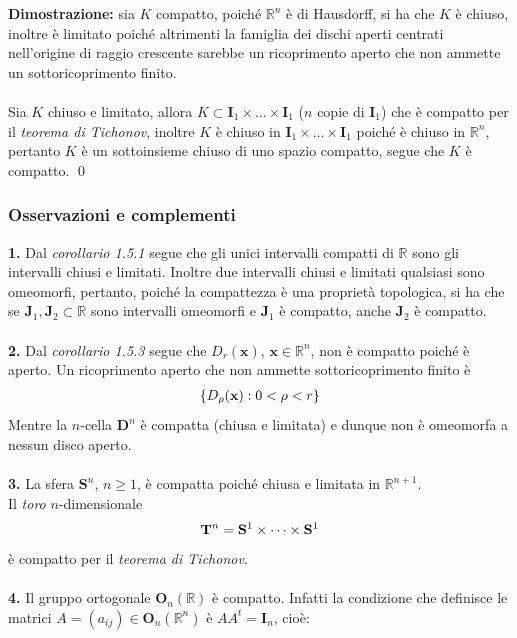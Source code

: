 \documentclass{article}
\begin{document}
\textbf{Dimostrazione:} sia $K$ compatto, poiché $\mathbb{R}^n$ è di Hausdorff, si ha che $K$ è chiuso, inoltre è limitato poiché altrimenti la famiglia dei dischi aperti centrati nell'origine di raggio crescente sarebbe un ricoprimento aperto che non ammette un sottoricoprimento finito. \\ \\
Sia $K$ chiuso e limitato, allora $K \subset \mathbf{I}_1 \times \dots \times \mathbf{I}_1$ ($n$ copie di $\mathbf{I}_1$) che è compatto per il \textit{teorema di Tichonov}, inoltre $K$ è chiuso in $\mathbf{I}_1 \times \dots \times \mathbf{I}_1$ poiché è chiuso in $\mathbb{R}^n$, pertanto $K$ è un sottoinsieme chiuso di uno spazio compatto, segue che $K$ è compatto. \qed
\subsubsection{Osservazioni e complementi}
\textbf{1.} Dal \textit{corollario 1.5.1} segue che gli unici intervalli compatti di $\mathbb{R}$ sono gli intervalli chiusi e limitati. Inoltre due intervalli chiusi e limitati qualsiasi sono omeomorfi, pertanto, poiché la compattezza è una proprietà topologica, si ha che se $\mathbf{J}_1, \mathbf{J}_2 \subset \mathbb{R}$ sono intervalli omeomorfi e $\mathbf{J}_1$ è compatto, anche $\mathbf{J}_2$ è compatto. \\ \\
\textbf{2.} Dal \textit{corollario 1.5.3} segue che $D_r(\mathbf{x})$, $\mathbf{x} \in \mathbb{R}^n$, non è compatto poiché è aperto. Un ricoprimento aperto che non ammette sottoricoprimento finito è
\begin{gather}
    \{ D_\rho (\mathbf{x}) : 0 < \rho < r \} \notag
\end{gather}
Mentre la $n$-cella $\mathbf{D}^n$ è compatta (chiusa e limitata) e dunque non è omeomorfa a nessun disco aperto. \\ \\
\textbf{3.} La sfera $\mathbf{S}^n$, $n \geq 1$, è compatta poiché chiusa e limitata in $\mathbb{R}^{n + 1}$. \\
Il \textit{toro} $n$-dimensionale
\begin{gather}
    \mathbf{T}^n = \mathbf{S}^1 \times \dots \times \mathbf{S}^1 \notag
\end{gather}
è compatto per il \textit{teorema di Tichonov}. \\ \\
\textbf{4.} Il gruppo ortogonale $\mathbf{O}_n(\mathbb{R})$ è compatto. Infatti la condizione che definisce le matrici $A = (a_{ij}) \in \mathbf{O}_n(\mathbb{R}^n)$ è $AA^t = \mathbf{I}_n$, cioè:
\end{document}
